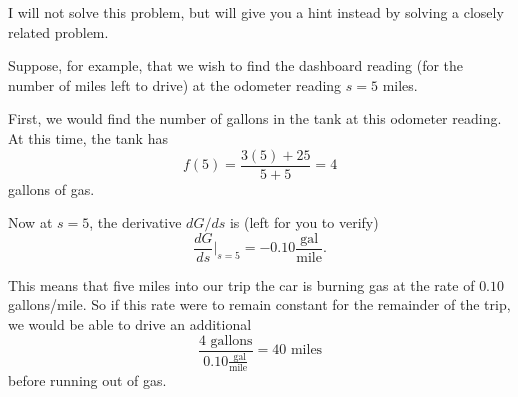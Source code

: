 \documentclass{ximera}
\begin{document}
\begin{enumerate}
\begin{explanation}
I will not solve this problem, but will give you a hint instead by solving a closely related problem.

Suppose, for example, that we wish to find the dashboard reading (for the number of miles left to drive) at the odometer reading $s=5$ miles.

First, we would find the number of gallons in the tank at this odometer reading. At this time, the tank has
\[
   f(5) = \frac{3(5)+25}{5+5} = 4
\]
gallons of gas.

Now at $s=5$, the derivative $dG/ds$ is  (left for you to verify)
\[
 \frac{dG}{ds}\Big|_{s=5} = -0.10 \frac{\text{gal}}{\text{mile}} .
\]
 
This means that five  miles into our trip the car is burning gas at the rate of $0.10$ gallons/mile. So if this rate were to remain constant for the remainder of the trip, we would be able to drive an additional
\[
      \frac{4 \text{ gallons}}{0.10 \frac{\text{ gal}}{\text{mile}}}  =40 \text{ miles}
\]
before running out of gas.

\end{explanation}




\end{enumerate}
\end{document}
